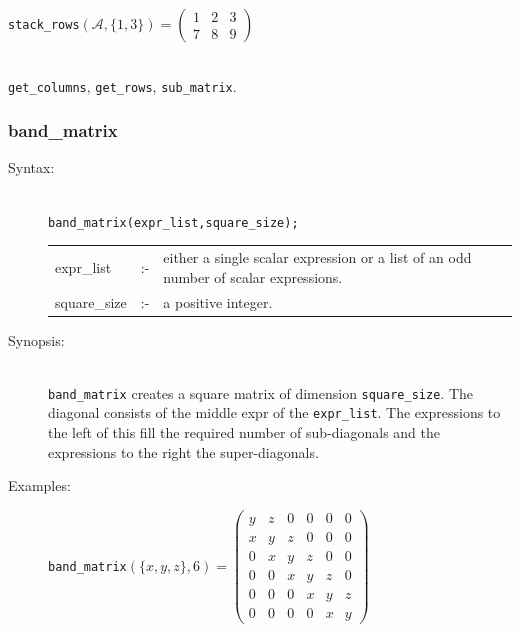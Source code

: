 {\begin{description}
  \texttt{stack\_rows}\((\mathcal{A},\{1,3\})  =
  \begin{pmatrix} 1 & 2 & 3 \\ 7 & 8 & 9 \end{pmatrix}\)

\item[Related functions:]\mbox{}\\
\texttt{get\_columns}, \texttt{get\_rows},
\texttt{sub\_matrix}.
\end{description}


\subsubsection{band\_matrix}
\label{linalg:band_matrix}
\hypertarget{operator:BAND_MATRIX}{}

\begin{description}
\item[Syntax:]\mbox{}\\
\texttt{band\_matrix(expr\_list,square\_size);}\\[2mm]
\begin{tabular}{l l p{.72\linewidth}}
expr\_list  &:-&
either a single scalar expression or a list of an odd number of scalar
expressions. \\
square\_size &:-& a positive integer.
\end{tabular}


\item[Synopsis:]\mbox{}\\
                \texttt{band\_matrix} creates a square matrix of
                dimension \texttt{square\_size}. The diagonal consists of the
                middle expr of the \texttt{expr\_list}. The expressions to the
                left of this fill the required number of sub-diagonals and the
                expressions to the right the super-diagonals.

\item[Examples:]
\begin{flushleft}
\texttt{band\_matrix}\((\{x,y,z\},6) =
 \begin{pmatrix} y & z & 0 & 0 & 0 & 0 \\
                 x & y & z & 0 & 0 & 0 \\
                 0 & x & y & z & 0 & 0 \\
                 0 & 0 & x & y & z & 0 \\
                 0 & 0 & 0 & x & y & z \\
                 0 & 0 & 0 & 0 & x & y
 \end{pmatrix}\)
\end{flushleft}


\end{description}}
